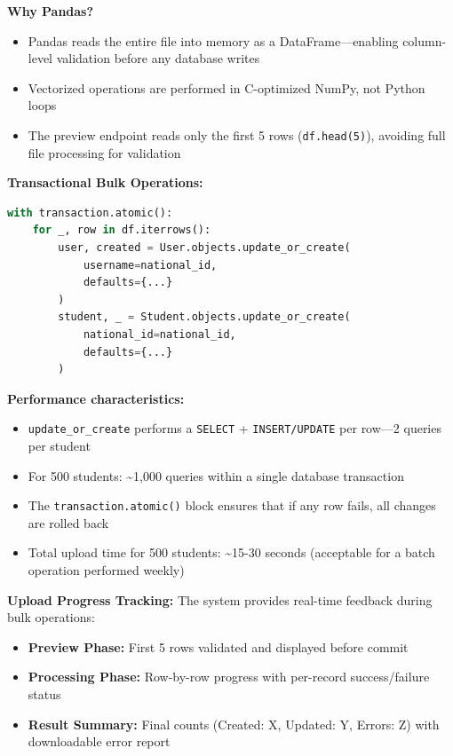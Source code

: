 \textbf{Why Pandas?}
\begin{itemize}
    \item Pandas reads the entire file into memory as a DataFrame---enabling column-level validation before any database writes
    \item Vectorized operations are performed in C-optimized NumPy, not Python loops
    \item The preview endpoint reads only the first 5 rows (\texttt{df.head(5)}), avoiding full file processing for validation
\end{itemize}

\textbf{Transactional Bulk Operations:}

\begin{lstlisting}[language=Python, caption=Atomic Bulk Create Pattern]
with transaction.atomic():
    for _, row in df.iterrows():
        user, created = User.objects.update_or_create(
            username=national_id,
            defaults={...}
        )
        student, _ = Student.objects.update_or_create(
            national_id=national_id,
            defaults={...}
        )
\end{lstlisting}

\textbf{Performance characteristics:}
\begin{itemize}
    \item \texttt{update\_or\_create} performs a \texttt{SELECT} + \texttt{INSERT/UPDATE} per row---2 queries per student
    \item For 500 students: \textasciitilde1,000 queries within a single database transaction
    \item The \texttt{transaction.atomic()} block ensures that if any row fails, all changes are rolled back
    \item Total upload time for 500 students: \textasciitilde15-30 seconds (acceptable for a batch operation performed weekly)
\end{itemize}

\textbf{Upload Progress Tracking:} The system provides real-time feedback during bulk operations:
\begin{itemize}
    \item \textbf{Preview Phase:} First 5 rows validated and displayed before commit
    \item \textbf{Processing Phase:} Row-by-row progress with per-record success/failure status
    \item \textbf{Result Summary:} Final counts (Created: X, Updated: Y, Errors: Z) with downloadable error report
\end{itemize}

